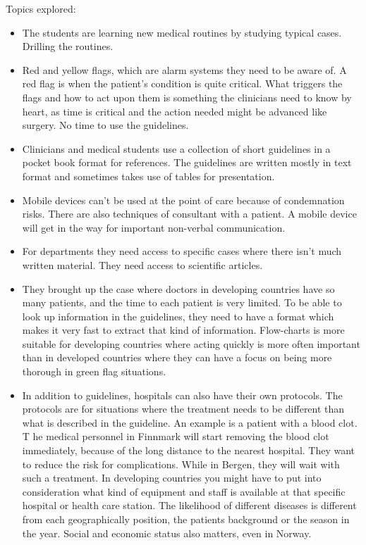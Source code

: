 Topics explored:
\begin{itemize}
	\item The students are learning new medical routines by studying typical cases. Drilling the routines.
	\item Red and yellow flags, which are alarm systems they need to be aware of. A red flag is when the patient's condition is quite critical. What triggers the flags and how to act upon them is something the clinicians need to know by heart, as time is critical and the action needed might be advanced like surgery. No time to use the guidelines.
	\item Clinicians and medical students use a collection of short guidelines in a pocket book format for references. The guidelines are written mostly in text format and sometimes takes use of tables for presentation.
	\item Mobile devices can't be used at the point of care because of condemnation risks. There are also techniques of consultant with a patient. A mobile device will get in the way for important non-verbal communication.
	\item For departments they need access to specific cases where there isn't much written material. They need access to scientific articles.
	\item They brought up the case where doctors in developing countries have so many patients, and the time to each patient is very limited. To be able to look up information in the guidelines, they need to have a format which makes it very fast to extract that kind of information. Flow-charts is more suitable for developing countries where acting quickly is more often important than in developed countries where they can have a focus on being more thorough in green flag situations.
	\item In addition to guidelines, hospitals can also have their own protocols. The protocols are for situations where the treatment needs to be different than what is described in the guideline. An example is a patient with a blood clot. T	he medical personnel in Finnmark will start removing the blood clot immediately, because of the long distance to the nearest hospital. They want to reduce the risk for complications. While in Bergen, they will wait with such a treatment. In developing countries you might have to put into consideration what kind of equipment and staff is available at that specific hospital or health care station. The likelihood of different diseases is different from each geographically position, the patients background or the season in the year. Social and economic status also matters, even in Norway.

\end{itemize}
